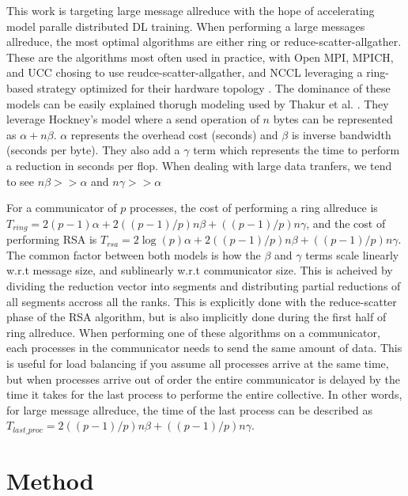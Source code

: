 This work is targeting large message allreduce with the hope of accelerating model paralle distributed DL training.
When performing a large messages allreduce, the most optimal algorithms are either ring or reduce-scatter-allgather.
These are the algorithms most often used in practice, with Open MPI, MPICH, and UCC chosing to use reudce-scatter-allgather, and NCCL leveraging a ring-based strategy optimized for their hardware topology \cite{gabriel2004OpenMPI, MPICH, UCC, NCCL}.
The dominance of these models can be easily explained thorugh modeling used by Thakur et al. \cite{Thakur2005OptMPICH}.
They leverage Hockney's model \cite{Hockney1994HockenyModel} where a send operation of $n$ bytes can be represented as $\alpha+n\beta$.
$\alpha$ represents the overhead cost (seconds) and $\beta$ is inverse bandwidth (seconds per byte).
They also add a $\gamma$ term which represents the time to perform a reduction in seconds per flop. 
When dealing with large data tranfers, we tend to see $n\beta>>\alpha$ and $n\gamma>>\alpha$ 

For a communicator of $p$ processes, the cost of performing a ring allreduce is $T_{ring} = 2(p-1)\alpha + 2((p-1)/p)n\beta + ((p-1)/p)n\gamma$, and the cost of performing RSA is $T_{rsa} = 2\log(p)\alpha + 2((p-1)/p)n\beta + ((p-1)/p)n\gamma$.
The common factor between both models is how the $\beta$ and $\gamma$ terms scale linearly w.r.t message size, and sublinearly w.r.t communicator size.
This is acheived by dividing the reduction vector into segments and distributing partial reductions of all segments accross all the ranks.
This is explicitly done with the reduce-scatter phase of the RSA algorithm, but is also implicitly done during the first half of ring allreduce.
When performing one of these algorithms on a communicator, each processes in the communicator needs to send the same amount of data.
This is useful for load balancing if you assume all processes arrive at the same time, but when processes arrive out of order the entire communicator is delayed by the time it takes for the last process to performe the entire collective.
In other words, for large message allreduce, the time of the last process can be described as $T_{last\_proc}=2((p-1)/p)n\beta + ((p-1)/p)n\gamma$.

\section{Method}

